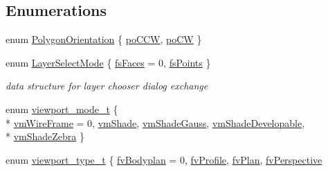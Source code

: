 \subsection*{Enumerations}
\begin{DoxyCompactItemize}
\item 
enum \hyperlink{namespaceShipCAD_a22a4489ec7a6505c3c30fa7562175ca4}{Polygon\+Orientation} \{ \hyperlink{namespaceShipCAD_a22a4489ec7a6505c3c30fa7562175ca4a01f1428a8463fbd20d80a779e70b39cd}{po\+C\+CW}, 
\hyperlink{namespaceShipCAD_a22a4489ec7a6505c3c30fa7562175ca4a785617c870ff5f0a2321ca2f6542aa7b}{po\+CW}
 \}
\item 
enum \hyperlink{namespaceShipCAD_a33e1c54e3609477478431b6a4c106804}{Layer\+Select\+Mode} \{ \hyperlink{namespaceShipCAD_a33e1c54e3609477478431b6a4c106804ade3fc9da994d6e6ab125978921665966}{fs\+Faces} = 0, 
\hyperlink{namespaceShipCAD_a33e1c54e3609477478431b6a4c106804a542ad0cef590007de75623cc41a83551}{fs\+Points}
 \}\begin{DoxyCompactList}\small\item\em data structure for layer chooser dialog exchange \end{DoxyCompactList}
\item 
enum \hyperlink{namespaceShipCAD_a67437198ee14f74e6c5277d761894863}{viewport\+\_\+mode\+\_\+t} \{ \\*
\hyperlink{namespaceShipCAD_a67437198ee14f74e6c5277d761894863a109cd328af19be260371a7e5333043f8}{vm\+Wire\+Frame} = 0, 
\hyperlink{namespaceShipCAD_a67437198ee14f74e6c5277d761894863ab1258f959e2d114750dffb3f9c2e2c0c}{vm\+Shade}, 
\hyperlink{namespaceShipCAD_a67437198ee14f74e6c5277d761894863aaf20984128d2e9697958fa8c329a801a}{vm\+Shade\+Gauss}, 
\hyperlink{namespaceShipCAD_a67437198ee14f74e6c5277d761894863a85babb2fea8446064bbbf526b10bf36b}{vm\+Shade\+Developable}, 
\\*
\hyperlink{namespaceShipCAD_a67437198ee14f74e6c5277d761894863a70fcfa9199faab53e43f138ed64ad12f}{vm\+Shade\+Zebra}
 \}
\item 
enum \hyperlink{namespaceShipCAD_aeeeb05810f2e31ef89fd4ac6b6ba9c0a}{viewport\+\_\+type\+\_\+t} \{ \hyperlink{namespaceShipCAD_aeeeb05810f2e31ef89fd4ac6b6ba9c0aa1bc519e3e41c233dd8e94c40af1fd36d}{fv\+Bodyplan} = 0, 
\hyperlink{namespaceShipCAD_aeeeb05810f2e31ef89fd4ac6b6ba9c0aa05a0a083efb18429cbb855b2dcbf5e18}{fv\+Profile}, 
\hyperlink{namespaceShipCAD_aeeeb05810f2e31ef89fd4ac6b6ba9c0aab67fb04b0624572e1567bff4caefde27}{fv\+Plan}, 
\hyperlink{namespaceShipCAD_aeeeb05810f2e31ef89fd4ac6b6ba9c0aaccdacbf26c0ffe78ae55326537a28dc1}{fv\+Perspective}

\end{DoxyCompactItemize}
